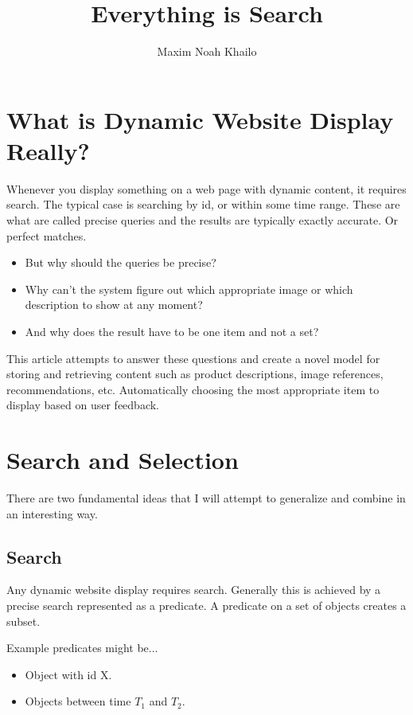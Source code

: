 \documentclass[11pt]{article}
\title{Everything is Search}
\author{Maxim Noah Khailo}
\begin{document}
\maketitle 
\section{What is Dynamic Website Display Really?}

Whenever you display something on a web page with dynamic content, it requires search.
The typical case is searching by id, or within some time range. These are what are called
precise queries and the results are typically exactly accurate. Or perfect matches.

\begin{itemize}
    \item But why should the queries be precise?
    \item Why can't the system figure out which appropriate image or which description to show at any moment?
    \item And why does the result have to be one item and not a set?
\end{itemize}

This article attempts to answer these questions and create a novel model for storing
and retrieving content such as product descriptions, image references, recommendations, etc.
Automatically choosing the most appropriate item to display based on user feedback.

\section{Search and Selection}

There are two fundamental ideas that I will attempt to generalize and combine
in an interesting way. 

\subsection{Search}

Any dynamic website display requires search. Generally this is achieved by a precise
search represented as a predicate. A predicate on a set of objects creates a subset.

\newpage
Example predicates might be...
\begin{itemize}
    \item Object with id X.
    \item Objects between time $T_1$ and $T_2$.
\end{itemize}
\end{document}
